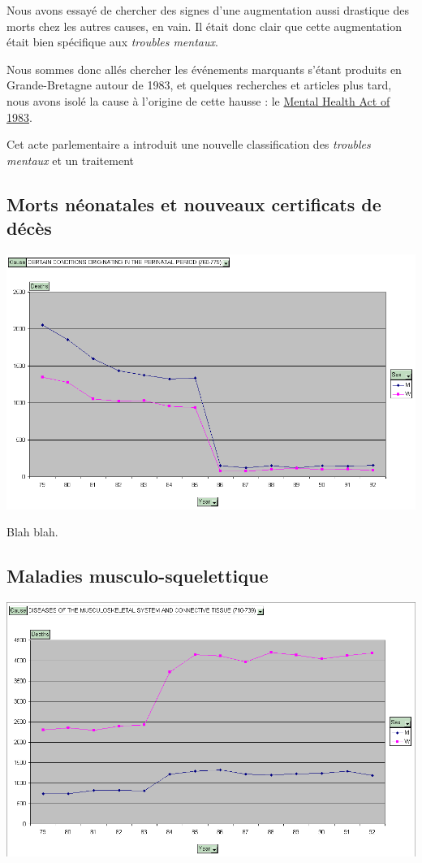     Nous avons essayé de chercher des signes d'une augmentation aussi drastique des morts chez les autres causes, en vain. Il était donc
    clair que cette augmentation était bien spécifique aux \textit{troubles mentaux}.

    Nous sommes donc allés chercher les événements marquants s'étant produits en Grande-Bretagne autour de 1983, et quelques recherches
    et articles plus tard, nous avons isolé la cause à l'origine de cette hausse : le \href{en.wikipedia.org/wiki/Mental_Health_Act_1983‎}{Mental Health Act of 1983}.

    Cet acte parlementaire a introduit une nouvelle classification des \textit{troubles mentaux} et un traitement

\subsection{Morts néonatales et nouveaux certificats de décès}

    \includegraphics[scale=0.5]{images/perinatal.png}

    Blah blah.

\subsection{Maladies musculo-squelettique}

    \includegraphics[scale=0.5]{images/muscoskeletal.png}

